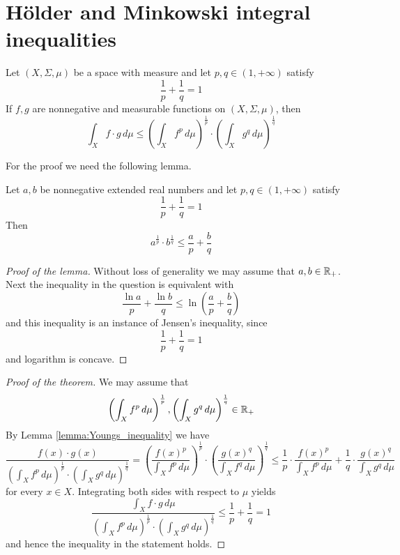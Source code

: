 \documentclass[10pt]{amsart}
\begin{document}
\section{H{\"o}lder and Minkowski integral inequalities}

\begin{theorem}[H{\"o}lder]\label{theorem:holder_inequality}
	Let $(X,\Sigma,\mu)$ be a space with measure and let $p,q \in (1,+\infty)$ satisfy
	$$\frac{1}{p} + \frac{1}{q} = 1$$
	If $f,g$ are nonnegative and measurable functions on $(X,\Sigma,\mu)$, then
	$$\int_X f\cdot g\,d\mu \leq \left(\int_X f^p\,d\mu\right)^{\frac{1}{p}}\cdot \left(\int_X g^q\,d\mu\right)^{\frac{1}{q}} $$
\end{theorem}
\noindent
For the proof we need the following lemma.

\begin{lemma}\label{lemma:Youngs_inequality}
	Let $a,b$ be nonnegative extended real numbers and let $p,q\in (1,+\infty)$ satisfy
	$$\frac{1}{p} + \frac{1}{q} = 1$$
	Then
	$$a^{\frac{1}{p}}\cdot b^{\frac{1}{q}} \leq \frac{a}{p} + \frac{b}{q}$$
\end{lemma}
\begin{proof}[Proof of the lemma]
	Without loss of generality we may assume that $a,b\in {\mathbb R}_+$. Next the inequality in the question is equivalent with
	$$\frac{\ln a}{p} + \frac{\ln b}{q} \leq \ln\left(\frac{a}{p} + \frac{b}{q}\right)$$
	and this inequality is an instance of Jensen's inequality, since
	$$\frac{1}{p} + \frac{1}{q} = 1$$
	and logarithm is concave.
\end{proof}

\begin{proof}[Proof of the theorem]
	We may assume that
	$$\left(\int_Xf^p\,d\mu\right)^{\frac{1}{p}}, \left(\int_Xg^q\,d\mu\right)^{\frac{1}{q}} \in {\mathbb R}_+$$
	By Lemma \ref{lemma:Youngs_inequality} we have
	$$\frac{f(x)\cdot g(x)}{\left(\int_X f^p\,d\mu\right)^{\frac{1}{p}}\cdot \left(\int_X g^q\,d\mu\right)^{\frac{1}{q}}} = \left(\frac{f(x)^{p}}{\int_X f^p\,d\mu}\right)^{\frac{1}{p}}\cdot \left(\frac{g(x)^{q}}{\int_X f^q\,d\mu}\right)^{\frac{1}{q}} \leq \frac{1}{p}\cdot \frac{f(x)^p}{\int_X f^p\,d\mu} + \frac{1}{q}\cdot \frac{g(x)^q}{\int_X g^q\,d\mu}$$
	for every $x \in X$. Integrating both sides with respect to $\mu$ yields
	$$\frac{\int_X f\cdot g\,d\mu}{\left(\int_X f^p\,d\mu\right)^{\frac{1}{p}}\cdot \left(\int_X g^q\,d\mu\right)^{\frac{1}{q}}}\leq \frac{1}{p} + \frac{1}{q} = 1$$
	and hence the inequality in the statement holds.
\end{proof}
\end{document}
